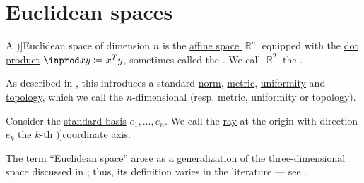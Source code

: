 \section{Euclidean spaces}\label{sec:euclidean_spaces}

\begin{definition}\label{def:euclidean_space}\mimprovised
  A \term[ru=Евклидово пространство (\cite[40]{Вулих1973РеальныйАнализ})]{Euclidean space} of dimension \( n \) is the \hyperref[def:affine_space]{affine space \( \BbbR^n \)} equipped with the \hyperref[def:inner_product_space]{dot product} \( \inprod x y \coloneqq x^T y \), sometimes called the . We call \( \BbbR^2 \) the .

  As described in , this introduces a standard \hyperref[def:norm]{norm}, \hyperref[def:metric_space]{metric}, \hyperref[def:uniform_space]{uniformity} and \hyperref[def:topological_space]{topology}, which we call the \( n \)-dimensional  (resp. metric, uniformity or topology).

  Consider the \hyperref[def:sequence_space]{standard basis} \( e_1, \ldots, e_n \). We call the \hyperref[def:geometric_ray]{ray} at the origin with direction \( e_k \) the \( k \)-th \term[ru=координатная ось (\cite[39]{Вулих1973РеальныйАнализ})]{coordinate axis}.

\end{definition}
\begin{comments}
  \item The term \enquote{Euclidean space} arose as a generalization of the three-dimensional space discussed in \cite{Fitzpatrick2008EuclidsElements}; thus, its definition varies in the literature --- see .
\end{comments}


